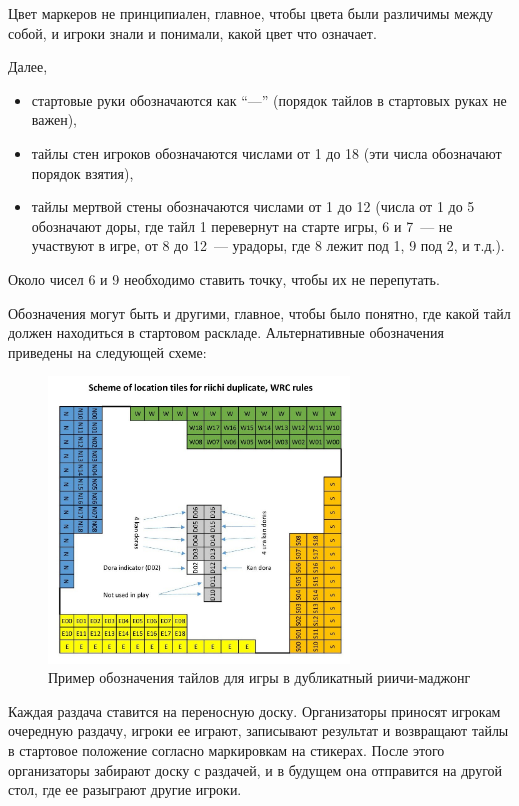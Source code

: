 \begin{additional}
Цвет маркеров не принципиален, главное, чтобы цвета были различимы между собой, и игроки знали и понимали, какой цвет что означает.

Далее,

\begin{itemize}
	\item стартовые руки обозначаются как ``---'' (порядок тайлов в стартовых руках не важен),
	\item тайлы стен игроков обозначаются числами от 1 до 18 (эти числа обозначают порядок взятия), 
	\item тайлы мертвой стены обозначаются числами от 1 до 12 (числа от 1 до 5 обозначают доры, где тайл 1 перевернут на старте игры, 6 и 7~--- не участвуют в игре, от 8 до 12~--- урадоры, где 8 лежит под 1, 9 под 2, и т.д.).
\end{itemize}

Около чисел 6 и 9 необходимо ставить точку, чтобы их не перепутать.

Обозначения могут быть и другими, главное, чтобы было понятно, где какой тайл должен находиться в стартовом раскладе. Альтернативные обозначения приведены на следующей схеме:

\begin{figure}[H]
	\centering
	\includegraphics[width=8cm]{img/duplicate_marks.jpg}
	\caption{Пример обозначения тайлов для игры в дубликатный риичи-маджонг}
\end{figure}

Каждая раздача ставится на переносную доску. Организаторы приносят игрокам очередную раздачу, игроки ее играют, записывают результат и возвращают тайлы в стартовое положение согласно маркировкам на стикерах. После этого организаторы забирают доску с раздачей, и в будущем она отправится на другой стол, где ее разыграют другие игроки.

\end{additional}
